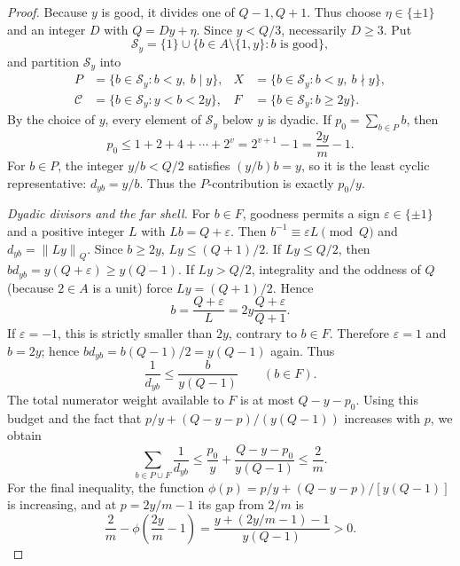 \documentclass[11pt]{article}
\theoremstyle{definition}
\theoremstyle{remark}
\newcommand{\normQ}[1]{\left\lVert #1\right\rVert_Q}
\begin{document}
\begin{proof}
Because \(y\) is good, it divides one of \(Q-1,Q+1\).  Thus choose
\(\eta\in\{\pm1\}\) and an integer \(D\) with \(Q=Dy+\eta\).  Since
\(y<Q/3\), necessarily \(D\ge3\).  Put
\[
 \mathcal S_y=\{1\}\cup
 \{b\in A\setminus\{1,y\}:b\text{ is good}\},
\]
and partition \(\mathcal S_y\) into
\[
 \begin{aligned}
 P&=\{b\in\mathcal S_y:b<y,\ b\mid y\},&
 X&=\{b\in\mathcal S_y:b<y,\ b\nmid y\},\\
 \mathcal C&=\{b\in\mathcal S_y:y<b<2y\},&
 F&=\{b\in\mathcal S_y:b\ge2y\}.
 \end{aligned}
\]
By the choice of \(y\), every element of \(\mathcal S_y\) below \(y\) is
dyadic.  If \(p_0=\sum_{b\in P}b\), then
\[
 p_0\le1+2+4+\cdots+2^v=2^{v+1}-1=\frac{2y}{m}-1.
\]
For \(b\in P\), the integer \(y/b<Q/2\) satisfies
\((y/b)b=y\), so it is the least cyclic representative:
\(d_{yb}=y/b\).  Thus the \(P\)-contribution is exactly \(p_0/y\).

\smallskip
\noindent\emph{Dyadic divisors and the far shell.}
For \(b\in F\), goodness permits a sign \(\varepsilon\in\{\pm1\}\)
and a positive integer \(L\) with
\(Lb=Q+\varepsilon\).  Then
\(b^{-1}\equiv\varepsilon L\pmod Q\) and
\(d_{yb}=\normQ{Ly}\).  Since \(b\ge2y\),
\(Ly\le(Q+1)/2\).  If \(Ly\le Q/2\), then
\(bd_{yb}=y(Q+\varepsilon)\ge y(Q-1)\).  If \(Ly>Q/2\), integrality
and the oddness of \(Q\) (because \(2\in A\) is a unit) force
\(Ly=(Q+1)/2\).  Hence
\[
 b=\frac{Q+\varepsilon}{L}
   =2y\frac{Q+\varepsilon}{Q+1}.
\]
If \(\varepsilon=-1\), this is strictly smaller than \(2y\), contrary to
\(b\in F\).  Therefore \(\varepsilon=1\) and \(b=2y\); hence
\(bd_{yb}=b(Q-1)/2=y(Q-1)\) again.  Thus
\begin{equation}\label{eq:far-baseline}
 \frac1{d_{yb}}\le\frac{b}{y(Q-1)}\qquad(b\in F).
\end{equation}
The total numerator weight available to \(F\) is at most
\(Q-y-p_0\).  Using this budget and the fact that
\(p/y+(Q-y-p)/(y(Q-1))\) increases with \(p\), we obtain
\begin{equation}\label{eq:P-F}
 \sum_{b\in P\cup F}\frac1{d_{yb}}
 \le\frac{p_0}{y}+\frac{Q-y-p_0}{y(Q-1)}\le\frac2m.
\end{equation}
For the final inequality, the function
\(\phi(p)=p/y+(Q-y-p)/[y(Q-1)]\) is increasing, and at
\(p=2y/m-1\) its gap from \(2/m\) is
\[
 \frac2m-\phi\!\left(\frac{2y}{m}-1\right)
 =\frac{y+(2y/m-1)-1}{y(Q-1)}>0.
\]


\end{proof}
\end{document}
